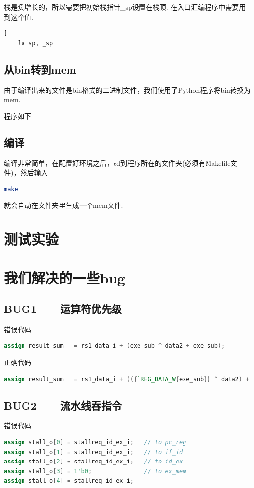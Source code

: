 \documentclass[lang=cn,11pt,a4paper,chinesefont=founder]{elegantpaper}
\begin{document}
栈是负增长的，所以需要把初始栈指针\_sp设置在栈顶. 在入口汇编程序中需要用到这个值. 

\begin{lstlisting}]
    la sp, _sp
\end{lstlisting}
\subsection{从bin转到mem}

由于编译出来的文件是bin格式的二进制文件，我们使用了Python程序将bin转换为mem. 

程序如下

\subsection{编译}

编译非常简单，在配置好环境之后，cd到程序所在的文件夹(必须有Makefile文件)，然后输入
\begin{lstlisting}[language=bash]
make
\end{lstlisting}
就会自动在文件夹里生成一个mem文件.
\section{测试实验}

\section{我们解决的一些bug}

\subsection{BUG1——运算符优先级}
错误代码
\begin{lstlisting}[language=verilog]
assign result_sum   = rs1_data_i + (exe_sub ^ data2 + exe_sub);
\end{lstlisting}

正确代码
\begin{lstlisting}[language=verilog]
assign result_sum   = rs1_data_i + (({`REG_DATA_W{exe_sub}} ^ data2) + exe_sub);
\end{lstlisting}

\subsection{BUG2——流水线吞指令}
错误代码
\begin{lstlisting}[language=verilog]
assign stall_o[0] = stallreq_id_ex_i;   // to pc_reg
assign stall_o[1] = stallreq_id_ex_i;   // to if_id
assign stall_o[2] = stallreq_id_ex_i;   // to id_ex
assign stall_o[3] = 1'b0;               // to ex_mem
assign stall_o[4] = stallreq_id_ex_i;
\end{lstlisting}
\end{document}
